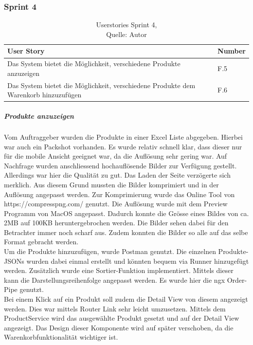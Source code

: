 \subsubsection{Sprint 4}
\begin{table}[H]
	\setlength\extrarowheight{2pt} %
	\begin{tabularx}{\textwidth}{|X|l|}
		\hline
		\textbf{User Story} & \textbf{Number} \\
		\hline
		Das System bietet die Möglichkeit, verschiedene Produkte anzuzeigen& F.5\\
		\hline
		Das System bietet die Möglichkeit, verschiedene Produkte dem Warenkorb hinzuzufügen& F.6\\
		\hline
	\end{tabularx} 
	\caption[Userstories Sprint 4]{Userstories Sprint 4,\\ Quelle: Autor}
\end{table}\label{userStoriesSprint4}

\subparagraph{Produkte anzuzeigen}
Vom Auftraggeber wurden die Produkte in einer Excel Liste abgegeben. Hierbei war auch ein Packshot vorhanden. Es wurde relativ schnell klar, dass dieser nur für die mobile Ansicht geeignet war, da die Auflösung sehr gering war. Auf Nachfrage wurden anschliessend hochauflösende Bilder zur Verfügung gestellt. Allerdings war hier die Qualität zu gut. Das Laden der Seite verzögerte sich merklich. Aus diesem Grund mussten die Bilder komprimiert und in der Auflösung angepasst werden. Zur Komprimierung wurde das Online Tool von https://compresspng.com/ genutzt. Die Auflösung wurde mit dem Preview Programm von MacOS angepasst. Dadurch konnte die Grösse eines Bildes von ca. 2MB auf 100KB heruntergebrochen werden. Die Bilder sehen dabei für den Betrachter immer noch scharf aus. Zudem konnten die Bilder so alle auf das selbe Format gebracht werden. \\
Um die Produkte hinzuzufügen, wurde Postman genutzt. Die einzelnen Produkte-JSONs wurden dabei einmal erstellt und könnten bequem via Runner hinzugefügt werden. 
Zusätzlich wurde eine Sortier-Funktion implementiert. Mittels dieser kann die Darstellungsreihenfolge angepasst werden. Es wurde hier die ngx Order-Pipe genutzt. \\
Bei einem Klick auf ein Produkt soll zudem die Detail View von diesem angezeigt werden. Dies war mittels Router Link sehr leicht umzusetzen. Mittels dem ProductService wird das ausgewählte Produkt gesetzt und auf der Detail View angezeigt. Das Design dieser Komponente wird auf später verschoben, da die Warenkorbfunktionalität wichtiger ist. 

